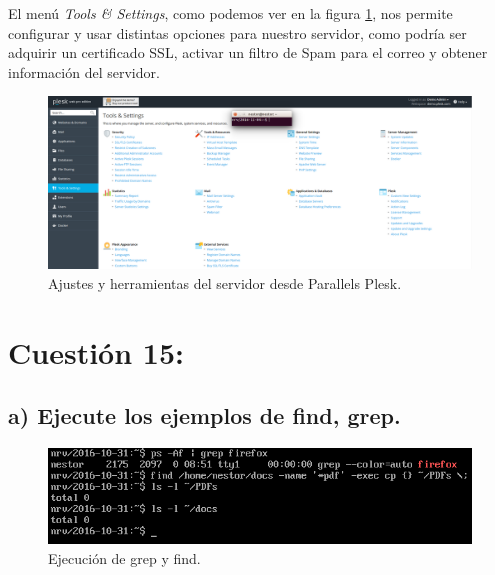 \documentclass[a4paper,titlepage,12pt]{scrartcl}	%
\numberwithin{figure}{section} %
\numberwithin{table}{section} %
\begin{document}
	El menú \textit{Tools \& Settings}, como podemos ver en la figura \ref{14-tools}, nos permite configurar y usar distintas opciones para nuestro servidor, como podría ser adquirir un certificado SSL, activar un filtro de Spam para el correo y obtener información del servidor.
	\begin{figure}[H]
		\includegraphics[width=\linewidth]{./Imagenes/14-tools.png}
		\vspace{-0.5cm}
		\caption[Ajustes y herramientas del servidor desde Parallels Plesk.]{Ajustes y herramientas  del servidor desde Parallels Plesk.}
		\label{14-tools}
	\end{figure}
	
	\section[Cuestión 15:]{Cuestión 15:}
	
	\subsection[a) Ejecute los ejemplos de find, grep.]{a) Ejecute los ejemplos de find, grep.}
	
	\begin{figure}[H]
		\includegraphics[width=\linewidth]{./Imagenes/15-grepfind.png}
		\vspace{-0.5cm}
		\caption[Ejecución de grep y find.]{Ejecución de grep y find.}
		\label{15-grepfind}
	\end{figure}
	
\end{document}
